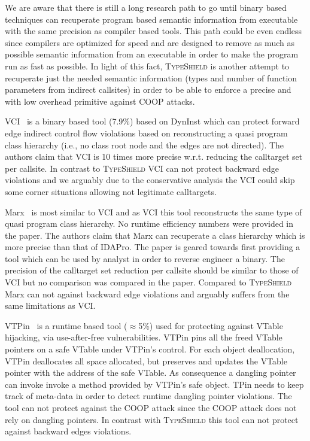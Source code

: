 We are aware that there is still a long research path to go until binary based techniques can 
recuperate program based semantic information from executable with the same precision as compiler based tools.
This path could be even endless since compilers are optimized for speed and are designed to remove as much as possible semantic information
from an executable in order to make the program run as fast as possible. In light of this fact,
\textsc{TypeShield} is another attempt to recuperate just the needed semantic information (types and number of function parameters from
indirect callsites) in order to be able to enforce a precise and with low overhead primitive against COOP attacks.

VCI~\cite{vci:asiaccs} is a binary based tool (7.9\%) based on DynInst which can protect forward edge indirect control flow violations based 
on reconstructing a quasi program class hierarchy (i.e., no class root node and the edges are not directed). The authors claim that 
VCI is 10 times more precise w.r.t. reducing the calltarget set per callsite. In contrast to \textsc{TypeShield} VCI can not 
protect backward edge violations and we arguably due to the conservative analysis the VCI could skip some corner situations 
allowing not legitimate calltargets.

Marx~\cite{marx} is most similar to VCI and as VCI this tool reconstructs the same type of quasi program class hierarchy. 
No runtime efficiency numbers were provided in the paper.
The authors claim that Marx can recuperate a class hierarchy which is more precise than that of IDAPro. The paper is geared towards
first providing a tool which can be used by analyst in order to reverse engineer a binary. The precision of the calltarget set reduction
per callsite should be similar to those of VCI but no comparison was compared in the paper. Compared to \textsc{TypeShield} 
Marx can not against backward edge violations and arguably suffers from the same limitations as VCI.

VTPin~\cite{vtpin} is a runtime based tool ($\approx$5\%) used for protecting against VTable hijacking, via use-after-free vulnerabilities. VTPin pins
all the freed VTable pointers on a safe VTable under VTPin’s control. For each object deallocation, VTPin deallocates all space allocated, but preserves and updates
the VTable pointer with the address of the safe VTable. As consequence a dangling pointer can invoke 
invoke a method provided by VTPin’s safe object. TPin needs to keep track of meta-data in order to detect runtime 
dangling pointer violations. The tool can not protect against the COOP attack since the COOP attack does not rely on dangling pointers.
In contrast with \textsc{TypeShield} this tool can not protect against backward edges violations.

